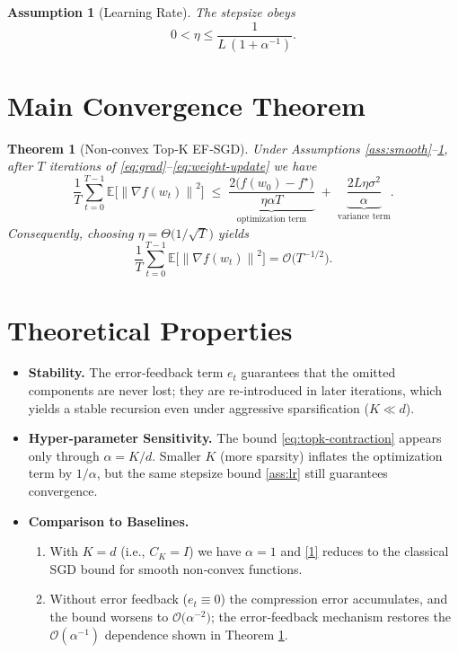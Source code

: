 \documentclass{article}
\newtheorem{theorem}{Theorem}
\newtheorem{assumption}{Assumption}
\newcommand{\E}{\mathbb{E}}
\newcommand{\norm}[1]{\left\|#1\right\|}
\begin{document}
\begin{assumption}[Learning Rate]
\label{ass:lr}
The stepsize obeys
\[
0<\eta\le \frac{1}{L\,(1+\alpha^{-1})}.
\]
\end{assumption}

\section*{Main Convergence Theorem}
\begin{theorem}[Non‑convex Top‑K EF‑SGD]\label{thm:main}
Under Assumptions \ref{ass:smooth}–\ref{ass:lr}, after $T$ iterations of \eqref{eq:grad}–\eqref{eq:weight-update} we have
\[
\frac{1}{T}\sum_{t=0}^{T-1}\E\!\bigl[\norm{\nabla f(w_t)}^{2}\bigr]
\;\le\;
\underbrace{\frac{2\bigl(f(w_0)-f^\star\bigr)}{\eta\alpha T}}_{\text{optimization term}}
\;+\;
\underbrace{\frac{2L\eta\sigma^{2}}{\alpha}}_{\text{variance term}} .
\tag{1}
\]
Consequently, choosing $\eta = \Theta\!\bigl(1/\sqrt{T}\bigr)$ yields
\[
\frac{1}{T}\sum_{t=0}^{T-1}\E\!\bigl[\norm{\nabla f(w_t)}^{2}\bigr]=\mathcal{O}\!\bigl(T^{-1/2}\bigr).
\]
\end{theorem}

\section*{Theoretical Properties}
\begin{itemize}[leftmargin=*]
\item \textbf{Stability.} The error‑feedback term $e_t$ guarantees that the omitted components are never lost; they are re‑introduced in later iterations, which yields a stable recursion even under aggressive sparsification ($K\ll d$).
\item \textbf{Hyper‑parameter Sensitivity.} The bound \eqref{eq:topk-contraction} appears only through $\alpha=K/d$. Smaller $K$ (more sparsity) inflates the optimization term by $1/\alpha$, but the same stepsize bound \eqref{ass:lr} still guarantees convergence.
\item \textbf{Comparison to Baselines.}
    \begin{enumerate}
        \item With $K=d$ (i.e., $C_{K}=I$) we have $\alpha=1$ and \eqref{1} reduces to the classical SGD bound for smooth non‑convex functions.
        \item Without error feedback ($e_t\equiv0$) the compression error accumulates, and the bound worsens to $\mathcal{O}\bigl(\alpha^{-2}\bigr)$; the error‑feedback mechanism restores the $\mathcal{O}(\alpha^{-1})$ dependence shown in Theorem \ref{thm:main}.
    \end{enumerate}
\end{itemize}
\end{document}
